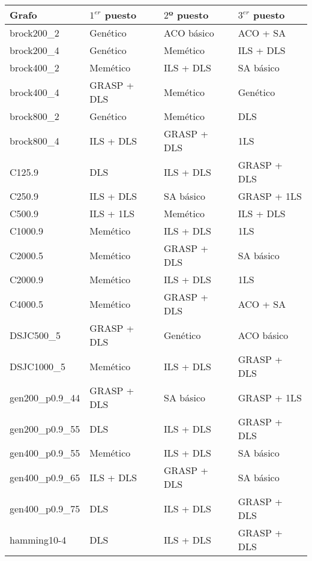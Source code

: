 \begin{small}
\begin{longtable}{l l l l}
  \label{table:posiciones}\\
  \endhead
  \endfoot
    Grafo              & $1^{er}$ puesto & $2$º puesto & $3^{er}$ puesto \\ \hline
    brock200\_2        & Genético & ACO básico & ACO + SA  \\  \hline
    brock200\_4        & Genético & Memético & ILS + DLS  \\  \hline
    brock400\_2        & Memético & ILS + DLS & SA básico  \\  \hline
    brock400\_4        & GRASP + DLS & Memético & Genético  \\  \hline
    brock800\_2        & Genético & Memético & DLS  \\  \hline
    brock800\_4        & ILS + DLS & GRASP + DLS & 1LS  \\  \hline
    C125.9             & DLS & ILS + DLS & GRASP + DLS  \\  \hline
    C250.9             & ILS + DLS & SA básico & GRASP + 1LS  \\  \hline
    C500.9             & ILS + 1LS & Memético & ILS + DLS \\  \hline
    C1000.9            & Memético & ILS + DLS & 1LS  \\  \hline
    C2000.5            & Memético & GRASP + DLS & SA básico  \\  \hline
    C2000.9            & Memético & ILS + DLS & 1LS  \\  \hline
    C4000.5            & Memético & GRASP + DLS & ACO + SA  \\  \hline
    DSJC500\_5         & GRASP + DLS & Genético & ACO básico  \\  \hline
    DSJC1000\_5        & Memético & ILS + DLS & GRASP + DLS  \\  \hline
    gen200\_p0.9\_44   & GRASP + DLS & SA básico & GRASP + 1LS  \\  \hline
    gen200\_p0.9\_55   & DLS & ILS + DLS & GRASP + DLS  \\  \hline
    gen400\_p0.9\_55   & Memético & ILS + DLS & SA básico  \\  \hline
    gen400\_p0.9\_65   & ILS + DLS & GRASP + DLS & SA básico  \\  \hline
    gen400\_p0.9\_75   & DLS & ILS + DLS & GRASP + DLS  \\  \hline
    hamming10-4        & DLS & ILS + DLS & GRASP + DLS  \\  \hline

\end{longtable}
\end{small}
